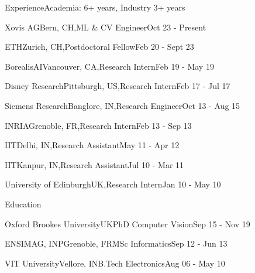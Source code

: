 \documentclass{resume_short} %
\begin{document}

\begin{paracol}{2}
\setlength{\columnsep}{2em}
\begin{rSection}{Experience}{\quad Academia: 6+ years, Industry 3+ years}
  \begin{rSubsection}{Xovis AG}{Bern, CH,}{ML \& CV Engineer}{Oct 23 - Present}\end{rSubsection}
  \begin{rSubsection}{ETH}{Zurich, CH,}{Postdoctoral Fellow}{Feb 20 - Sept 23}\end{rSubsection}
  \begin{rSubsection}{BorealisAI}{Vancouver, CA,}{Research Intern}{Feb 19 - May 19}\end{rSubsection}
  \begin{rSubsection}{Disney Research}{Pittsburgh, US,}{Research Intern}{Feb 17 - Jul 17}\end{rSubsection}
  \begin{rSubsection}{Siemens Research}{Banglore, IN,}{Research Engineer}{Oct 13 - Aug 15}\end{rSubsection}
  \begin{rSubsection}{INRIA}{Grenoble, FR,}{Research Intern}{Feb 13 - Sep 13}\end{rSubsection}
  \begin{rSubsection}{IIT}{Delhi, IN,}{Research Assistant}{May 11 - Apr 12}\end{rSubsection}
  \begin{rSubsection}{IIT}{Kanpur, IN,}{Research Assistant}{Jul 10 - Mar 11}\end{rSubsection}
  \begin{rSubsection}{University of Edinburgh}{UK,}{Research Intern}{Jan 10 - May 10}\end{rSubsection}
\end{rSection}

\begin{rSection}{Education}{}
\begin{eSubsection}{Oxford Brookes University}{UK}{PhD Computer Vision}{Sep 15 - Nov 19}\end{eSubsection}
\begin{eSubsection}{ENSIMAG, INP}{Grenoble, FR}{MSc Informatics}{Sep 12 - Jun 13}\end{eSubsection}
\begin{eSubsection}{VIT University}{Vellore, IN}{B.Tech Electronics}{Aug 06 - May 10}\end{eSubsection} 
\end{rSection}



\end{paracol}
\end{document}
